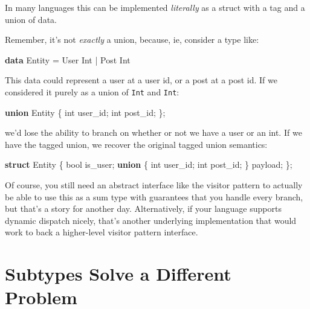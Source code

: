 \documentclass[]{article}
\newenvironment{Shaded}{}{}
\newcommand{\DataTypeTok}[1]{\textcolor[rgb]{0.56,0.13,0.00}{#1}}
\newcommand{\KeywordTok}[1]{\textcolor[rgb]{0.00,0.44,0.13}{\textbf{#1}}}
\newcommand{\NormalTok}[1]{#1}
\newcommand{\OperatorTok}[1]{\textcolor[rgb]{0.40,0.40,0.40}{#1}}
\newcommand{\OtherTok}[1]{\textcolor[rgb]{0.00,0.44,0.13}{#1}}
\begin{document}
In many languages this can be implemented \emph{literally} as a struct with a
tag and a union of data.

Remember, it's not \emph{exactly} a union, because, ie, consider a type like:

\begin{Shaded}
\begin{Highlighting}[]
\KeywordTok{data} \DataTypeTok{Entity} \OtherTok{=} \DataTypeTok{User} \DataTypeTok{Int} \OperatorTok{|} \DataTypeTok{Post} \DataTypeTok{Int}
\end{Highlighting}
\end{Shaded}

This data could represent a user at a user id, or a post at a post id. If we
considered it purely as a union of \texttt{Int} and \texttt{Int}:

\begin{Shaded}
\begin{Highlighting}[]
\KeywordTok{union}\NormalTok{ Entity }\OperatorTok{\{}
    \DataTypeTok{int}\NormalTok{ user\_id}\OperatorTok{;}
    \DataTypeTok{int}\NormalTok{ post\_id}\OperatorTok{;}
\OperatorTok{\};}
\end{Highlighting}
\end{Shaded}

we'd lose the ability to branch on whether or not we have a user or an int. If
we have the tagged union, we recover the original tagged union semantics:

\begin{Shaded}
\begin{Highlighting}[]
\KeywordTok{struct}\NormalTok{ Entity }\OperatorTok{\{}
    \DataTypeTok{bool}\NormalTok{ is\_user}\OperatorTok{;}
    \KeywordTok{union} \OperatorTok{\{}
        \DataTypeTok{int}\NormalTok{ user\_id}\OperatorTok{;}
        \DataTypeTok{int}\NormalTok{ post\_id}\OperatorTok{;}
    \OperatorTok{\}}\NormalTok{ payload}\OperatorTok{;}
\OperatorTok{\};}
\end{Highlighting}
\end{Shaded}

Of course, you still need an abstract interface like the visitor pattern to
actually be able to use this as a sum type with guarantees that you handle every
branch, but that's a story for another day. Alternatively, if your language
supports dynamic dispatch nicely, that's another underlying implementation that
would work to back a higher-level visitor pattern interface.

\section{Subtypes Solve a Different
Problem}\label{subtypes-solve-a-different-problem}
\end{document}
